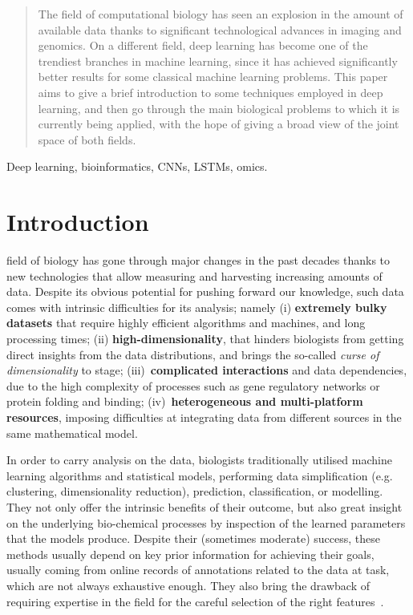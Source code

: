 \documentclass[journal]{IEEEtran}
\begin{document}
\begin{abstract}
The field of computational biology has seen an explosion in the amount of available data thanks to significant technological advances in imaging and genomics. On a different field, deep learning has become one of the trendiest branches in machine learning, since it has achieved significantly better results for some classical machine learning problems. This paper aims to give a brief introduction to some techniques employed in deep learning, and then go through the main biological problems to which it is currently being applied, with the hope of giving a broad view of the joint space of both fields.
\end{abstract}

\begin{IEEEkeywords}
Deep learning, bioinformatics, CNNs, LSTMs, omics.
\end{IEEEkeywords}

\IEEEpeerreviewmaketitle

\section{Introduction}
 field of biology has gone through major changes in the past decades thanks to new technologies that allow measuring and harvesting increasing amounts of data. Despite its obvious potential for pushing forward our knowledge, such data comes with intrinsic difficulties for its analysis; namely (i) \textbf{extremely bulky datasets} that require highly efficient algorithms and machines, and long processing times; (ii) \textbf{high-dimensionality}, that hinders biologists from getting direct insights from the data distributions, and brings the so-called \textit{curse of dimensionality} to stage; (iii)~\textbf{complicated interactions} and data dependencies, due to the high complexity of processes such as gene regulatory networks or protein folding and binding; (iv)~\textbf{heterogeneous and multi-platform resources}, imposing difficulties at integrating data from different sources in the same mathematical model.

In order to carry analysis on the data, biologists traditionally utilised machine learning algorithms and statistical models, performing data simplification (e.g. clustering, dimensionality reduction), prediction, classification, or modelling. They not only offer the intrinsic benefits of their outcome, but also great insight on the underlying bio-chemical processes by inspection of the learned parameters that the models produce. Despite their (sometimes moderate) success, these methods usually depend on key prior information for achieving their goals, usually coming from online records of annotations related to the data at task, which are not always exhaustive enough. They also bring the drawback of requiring expertise in the field for the careful selection of the right features~\cite{Libbrecht2015}.
\end{document}
